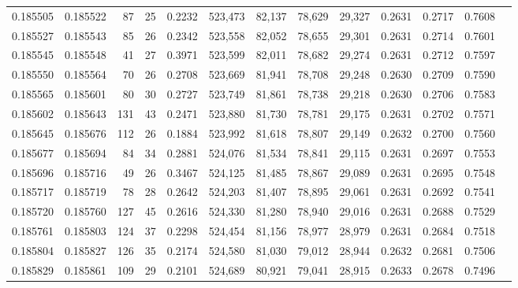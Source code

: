 \begin{tabular}{rrrrrrrrrrrrr}
0.185505 & 0.185522 &    87 &  25 &                                     0.2232 & 523,473 &  82,137 &  78,629 &  29,327 & 0.2631 & 0.2717 & 0.7608 \\
0.185527 & 0.185543 &    85 &  26 &                                     0.2342 & 523,558 &  82,052 &  78,655 &  29,301 & 0.2631 & 0.2714 & 0.7601 \\
0.185545 & 0.185548 &    41 &  27 &                                     0.3971 & 523,599 &  82,011 &  78,682 &  29,274 & 0.2631 & 0.2712 & 0.7597 \\
0.185550 & 0.185564 &    70 &  26 &                                     0.2708 & 523,669 &  81,941 &  78,708 &  29,248 & 0.2630 & 0.2709 & 0.7590 \\
0.185565 & 0.185601 &    80 &  30 &                                     0.2727 & 523,749 &  81,861 &  78,738 &  29,218 & 0.2630 & 0.2706 & 0.7583 \\
0.185602 & 0.185643 &   131 &  43 &                                     0.2471 & 523,880 &  81,730 &  78,781 &  29,175 & 0.2631 & 0.2702 & 0.7571 \\
0.185645 & 0.185676 &   112 &  26 &                                     0.1884 & 523,992 &  81,618 &  78,807 &  29,149 & 0.2632 & 0.2700 & 0.7560 \\
0.185677 & 0.185694 &    84 &  34 &                                     0.2881 & 524,076 &  81,534 &  78,841 &  29,115 & 0.2631 & 0.2697 & 0.7553 \\
0.185696 & 0.185716 &    49 &  26 &                                     0.3467 & 524,125 &  81,485 &  78,867 &  29,089 & 0.2631 & 0.2695 & 0.7548 \\
0.185717 & 0.185719 &    78 &  28 &                                     0.2642 & 524,203 &  81,407 &  78,895 &  29,061 & 0.2631 & 0.2692 & 0.7541 \\
0.185720 & 0.185760 &   127 &  45 &                                     0.2616 & 524,330 &  81,280 &  78,940 &  29,016 & 0.2631 & 0.2688 & 0.7529 \\
0.185761 & 0.185803 &   124 &  37 &                                     0.2298 & 524,454 &  81,156 &  78,977 &  28,979 & 0.2631 & 0.2684 & 0.7518 \\
0.185804 & 0.185827 &   126 &  35 &                                     0.2174 & 524,580 &  81,030 &  79,012 &  28,944 & 0.2632 & 0.2681 & 0.7506 \\
0.185829 & 0.185861 &   109 &  29 &                                     0.2101 & 524,689 &  80,921 &  79,041 &  28,915 & 0.2633 & 0.2678 & 0.7496 \\

\end{tabular}
